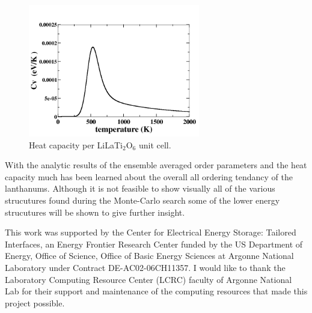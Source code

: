 \documentclass[aps,prl,reprint,superscriptaddress,showkeys]{revtex4-1}
\begin{document}
\begin{figure}[h!]
\includegraphics[width=7.5cm]{./figures/Cv.png}
\caption{Heat capacity per LiLaTi$_2$O$_6$ unit cell. \label{Cvplot}} 
\end{figure}
With the analytic results of the ensemble averaged order parameters and the heat capacity much has been learned about the overall all ordering tendancy of the lanthanums. Although it is not feasible to show visually all of the various strucutures found during the Monte-Carlo search some of the lower energy strucutures will be shown to give further insight. 

\begin{acknowledgments}
This work was supported by the Center for Electrical Energy Storage: Tailored Interfaces, an Energy Frontier Research Center funded 
by the US Department of Energy, Office of Science, Office of Basic Energy Sciences at Argonne National Laboratory under Contract DE-AC02-06CH11357.
I would like to thank the Laboratory Computing Resource Center (LCRC) faculty of Argonne National Lab for their support and maintenance of the computing resources that made this project possible. 
\end{acknowledgments}


\end{document}
